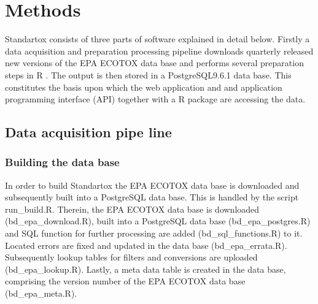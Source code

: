 
\section*{Methods}


Standartox consists of three parts of software explained in detail below. Firstly a data acquisition and preparation processing pipeline downloads quarterly released new versions of the EPA ECOTOX data base and performs several preparation steps in R \citep{rcoreteam_language_2017}. The output is then stored in a PostgreSQL9.6.1 data base. This constitutes the basis upon which the web application and and application programming interface (API) together with a R package are accessing the data. 

\subsection*{Data acquisition pipe line}
\subsubsection*{Building the data base}
In order to build Standartox the EPA ECOTOX data base is downloaded and subsequently built into a PostgreSQL data base. This is handled by the script run\_build.R. Therein, the EPA ECOTOX data base is downloaded (bd\_epa\_download.R), built into a PostgreSQL data base (bd\_epa\_postgres.R) and SQL function for further processing are added (bd\_sql\_functions.R) to it. Located errors are fixed and updated in the data base (bd\_epa\_errata.R). Subsequently lookup tables for filters and conversions are uploaded (bd\_epa\_lookup.R). Lastly, a meta data table is created in the data base, comprising the version number of the EPA ECOTOX data base (bd\_epa\_meta.R).
